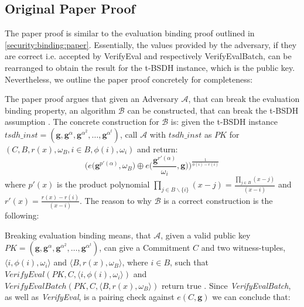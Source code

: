 \subsection*{Original Paper Proof}
The paper proof is similar to the evaluation binding proof outlined in \ref{security:binding:paper}. Essentially, the values provided by the adversary, if they are correct i.e. accepted by VerifyEval and respectively VerifyEvalBatch, can be rearranged to obtain the result for the t-BSDH instance, which is the public key. Nevertheless, we outline the paper proof concretely for completeness:

The paper proof argues that given an Adversary $\mathcal{A}$, that can break the evaluation binding property, an algorithm $\mathcal{B}$ can be constructed, that can break the t-BSDH assumption \parencite{KZG}. The concrete construction for $\mathcal{B}$ is: given the t-BSDH instance $tsdh\_inst =(\mathbf{g}, \mathbf{g}^{\alpha}, \mathbf{g}^{\alpha^2},\dots, \mathbf{g}^{\alpha^t})$, call $\mathcal{A}$ with $tsdh\_inst$ as $PK$ for $(C,B, r(x), \omega_B, i \in B,\phi(i),\omega_i)$ and return: 
$$ \biggl(e\biggl(\mathbf{g}^{p'(\alpha)}, \omega_B\biggr) \oplus e\biggl(\frac{\mathbf{g}^{r'(\alpha)}}{\omega_i}, \mathbf{g}\biggr)\biggr)^{\frac{1}{\phi(i)-r(i)}}$$
where $p'(x)$ is the product polynomial $\prod_{j\in B\backslash\{i\}}^{}(x-j) = \frac{\prod_{j\in B}^{}(x-j)}{(x-i)}$ and $r'(x)=\frac{r(x)-r(i)}{(x-i)}$.
The reason to why $\mathcal{B}$ is a correct construction is the following: 

Breaking evaluation binding means, that $\mathcal{A}$, given a valid public key $PK=(\mathbf{g}, \mathbf{g}^{\alpha}, \mathbf{g}^{\alpha^2},\dots, \mathbf{g}^{\alpha^t})$, can give a Commitment $C$ and two witness-tuples, $\langle i, \phi(i),\omega_i\rangle$ and $\langle B, r(x), \omega_B\rangle$, where $i \in B$, such that $VerifyEval(PK, C,\langle i,\phi(i), \omega_i\rangle )$ and $VerifyEvalBatch(PK, C,\langle B,r(x), \omega_B\rangle )$ return true \parencite{KZG}. Since \textit{VerifyEvalBatch}, as well as \textit{VerifyEval}, is a pairing check against $e(C,\mathbf{g})$ we can conclude that: 

